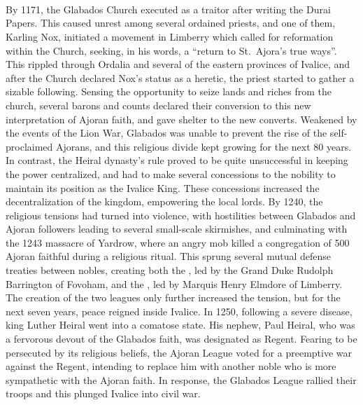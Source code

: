 %
\\\\
%
\\
By 1171, the Glabados Church executed  as a traitor after writing the Durai Papers. 
This caused unrest among several ordained priests, and one of them, Karling Nox, initiated a movement in Limberry which called for reformation within the Church, seeking, in his words, a “return to St.~Ajora’s true ways”. 
This rippled through Ordalia and several of the eastern provinces of Ivalice, and after the Church declared Nox’s status as a heretic, the priest started to gather a sizable following. 
Sensing the opportunity to seize lands and riches from the church, several barons and counts declared their conversion to this new interpretation of Ajoran faith, and gave shelter to the new converts.
Weakened by the events of the Lion War, Glabados was unable to prevent the rise of the self-proclaimed Ajorans, and this religious divide kept growing for the next 80 years. In contrast, the Heiral dynasty's rule proved to be quite unsuccessful in keeping the power centralized, and had to make several concessions to the nobility to maintain its position as the Ivalice King.
These concessions increased the decentralization of the kingdom, empowering the local lords.
By 1240, the religious tensions had turned into violence, with hostilities between Glabados and Ajoran followers leading to several small-scale skirmishes, and culminating with the 1243 massacre of Yardrow, where an angry mob killed a congregation of 500 Ajoran faithful during a religious ritual. 
This sprung several mutual defense treaties between nobles, creating both the , led by the Grand Duke Rudolph Barrington of Fovoham, and the , led by Marquis Henry Elmdore of Limberry. 
The creation of the two leagues only further increased the tension, but for the next seven years, peace reigned inside Ivalice.
In 1250, following a severe disease, king Luther Heiral went into a comatose state. 
His nephew, Paul Heiral, who was a fervorous devout of the Glabados faith, was designated as Regent. 
Fearing to be persecuted by its religious beliefs, the Ajoran League voted for a preemptive war against the Regent, intending to replace him with another noble who is more sympathetic with the Ajoran faith. 
In response, the Glabados League rallied their troops and this plunged Ivalice into civil war.
